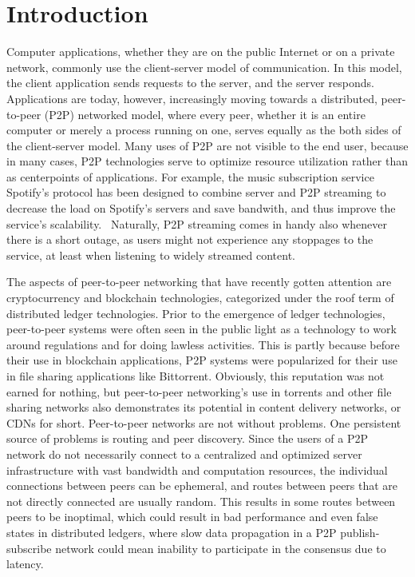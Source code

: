 \chapter{Introduction}
\label{Introduction}

Computer applications, whether they are on the public Internet or on a private network, commonly use the client-server model of communication. In this model, the client application sends requests to the server, and the server responds. Applications are today, however, increasingly moving towards a distributed, peer-to-peer (P2P) networked model, where every peer, whether it is an entire computer or merely a process running on one, serves equally as the both sides of the client-server model. Many uses of P2P are not visible to the end user, because in many cases, P2P technologies serve to optimize resource utilization rather than as centerpoints of applications. For example, the music subscription service Spotify's protocol has been designed to combine server and P2P streaming to decrease the load on Spotify's servers and save bandwith, and thus improve the service's scalability.~\cite{Kreitz_undated-yp} Naturally, P2P streaming comes in handy also whenever there is a short outage, as users might not experience any stoppages to the service, at least when listening to widely streamed content. 

The aspects of peer-to-peer networking that have recently gotten attention are cryptocurrency and blockchain technologies, categorized under the roof term of distributed ledger technologies. Prior to the emergence of ledger technologies, peer-to-peer systems were often seen in the public light as a technology to work around regulations and for doing lawless activities. This is partly because before their use in blockchain applications, P2P systems were popularized for their use in file sharing applications like Bittorrent. Obviously, this reputation was not earned for nothing, but peer-to-peer networking's use in torrents and other file sharing networks also demonstrates its potential in content delivery networks, or CDNs for short. Peer-to-peer networks are not without problems. One persistent source of problems is routing and peer discovery. Since the users of a P2P network do not necessarily connect to a centralized and optimized server infrastructure with vast bandwidth and computation resources, the individual connections between peers can be ephemeral, and routes between peers that are not directly connected are usually random. This results in some routes between peers to be inoptimal, which could result in bad performance and even false states in distributed ledgers, where slow data propagation in a P2P publish-subscribe network could mean inability to participate in the consensus due to latency. %

